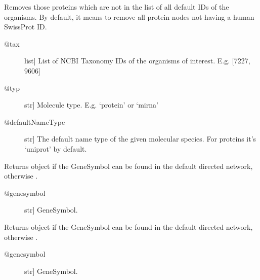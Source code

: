 \documentclass[letterpaper,10pt,english]{sphinxmanual}
\begin{document}
\begin{fulllineitems}
\begin{fulllineitems}
\begin{quote}
\begin{description}
\end{description}\end{quote}

\end{fulllineitems}


\begin{fulllineitems}
\label{\detokenize{main:pypath.main.PyPath.delete_unknown}}
Removes those proteins which are not in the list of all default
IDs of the organisms. By default, it means to remove all protein
nodes not having a human SwissProt ID.
\begin{description}
\item[{@tax}] \leavevmode{[}list{]}
List of NCBI Taxonomy IDs of the organisms of interest.
E.g. {[}7227, 9606{]}

\item[{@typ}] \leavevmode{[}str{]}
Molecule type. E.g. ‘protein’ or ‘mirna’

\item[{@defaultNameType}] \leavevmode{[}str{]}
The default name type of the given molecular species.
For proteins it’s ‘uniprot’ by default.

\end{description}

\end{fulllineitems}


\begin{fulllineitems}
\label{\detokenize{main:pypath.main.PyPath.dgenesymbol}}
Returns  object if the GeneSymbol
can be found in the default directed network,
otherwise .
\begin{description}
\item[{@genesymbol}] \leavevmode{[}str{]}
GeneSymbol.

\end{description}

\end{fulllineitems}


\begin{fulllineitems}
\label{\detokenize{main:pypath.main.PyPath.dgs}}
Returns  object if the GeneSymbol
can be found in the default directed network,
otherwise .
\begin{description}
\item[{@genesymbol}] \leavevmode{[}str{]}
GeneSymbol.


\end{description}
\end{fulllineitems}
\end{fulllineitems}
\end{document}

